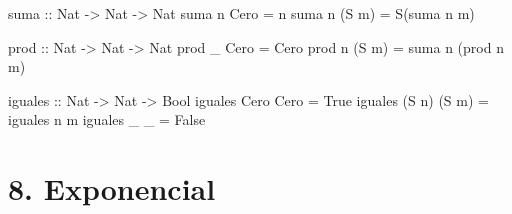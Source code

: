 \documentclass[spanish,]{article}
\newenvironment{Shaded}{}{}
\newcommand{\DataTypeTok}[1]{\textcolor[rgb]{0.56,0.13,0.00}{#1}}
\newcommand{\FunctionTok}[1]{\textcolor[rgb]{0.02,0.16,0.49}{#1}}
\newcommand{\NormalTok}[1]{#1}
\newcommand{\OtherTok}[1]{\textcolor[rgb]{0.00,0.44,0.13}{#1}}
\begin{document}
\begin{Shaded}
\begin{Highlighting}[]
\OtherTok{suma ::} \DataTypeTok{Nat} \OtherTok{->} \DataTypeTok{Nat} \OtherTok{->} \DataTypeTok{Nat}
\NormalTok{suma n }\DataTypeTok{Cero}  \FunctionTok{=}\NormalTok{ n}
\NormalTok{suma n (}\DataTypeTok{S}\NormalTok{ m) }\FunctionTok{=} \DataTypeTok{S}\NormalTok{(suma n m)}

\OtherTok{prod ::} \DataTypeTok{Nat} \OtherTok{->} \DataTypeTok{Nat} \OtherTok{->} \DataTypeTok{Nat}
\NormalTok{prod _ }\DataTypeTok{Cero}  \FunctionTok{=} \DataTypeTok{Cero}
\NormalTok{prod n (}\DataTypeTok{S}\NormalTok{ m) }\FunctionTok{=}\NormalTok{ suma n (prod n m)}

\OtherTok{iguales ::} \DataTypeTok{Nat} \OtherTok{->} \DataTypeTok{Nat} \OtherTok{->} \DataTypeTok{Bool}
\NormalTok{iguales }\DataTypeTok{Cero}  \DataTypeTok{Cero}  \FunctionTok{=} \DataTypeTok{True}
\NormalTok{iguales (}\DataTypeTok{S}\NormalTok{ n) (}\DataTypeTok{S}\NormalTok{ m) }\FunctionTok{=}\NormalTok{ iguales n m}
\NormalTok{iguales    _     _  }\FunctionTok{=} \DataTypeTok{False}
\end{Highlighting}
\end{Shaded}

\hypertarget{exponencial}{%
\section{8. Exponencial}\label{exponencial}}

\begin{Shaded}
\end{Shaded}
\end{document}
